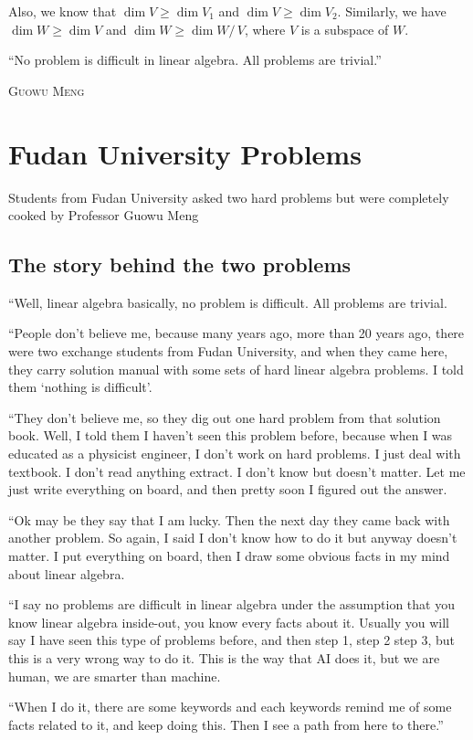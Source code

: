 \documentclass[
	11pt, %
	fleqn, %
	a4paper, %
]{LegrandOrangeBook}
\newcommand{\quotient}[2]{#1/\, #2} %
\let\originalepigraph\epigraph
\renewcommand\epigraph[2]{\originalepigraph{#1}{\textsc{#2}}}
\begin{document}
Also, we know that $\dim{V} \geq \dim{V_1}$ and $\dim{V} \geq \dim{V_2}$. Similarly, we have $\dim{W} \geq \dim{V}$ and $\dim{W} \geq \dim{\quotient{W}{V}}$, where $V$ is a subspace of $W$.

\newpage

\epigraph{``No problem is difficult in linear algebra. All problems are trivial.''}{Guowu Meng}

\section{Fudan University Problems}

Students from Fudan University asked two hard problems but were completely cooked by Professor Guowu Meng

\subsection{The story behind the two problems}
``Well, linear algebra basically, no problem is difficult. All problems are trivial. 

``People don't believe me, because many years ago, more than 20 years ago, there were two exchange students from Fudan University, and when they came here, they carry solution manual with some sets of hard linear algebra problems. I told them `nothing is difficult'. 

``They don't believe me, so they dig out one hard problem from that solution book. Well, I told them I haven't seen this problem before, because when I was educated as a physicist engineer, I don't work on hard problems. I just deal with textbook. I don't read anything extract. I don't know but doesn't matter. Let me just write everything on board, and then pretty soon I figured out the answer. 

``Ok may be they say that I am lucky. Then the next day they came back with another problem. So again, I said I don't know how to do it but anyway doesn't matter. I put everything on board, then I draw some obvious facts in my mind about linear algebra. 

``I say no problems are difficult in linear algebra under the assumption that you know linear algebra inside-out, you know every facts about it. Usually you will say I have seen this type of problems before, and then step 1, step 2 step 3, but this is a very wrong way to do it. This is the way that AI does it, but we are human, we are smarter than machine. 

``When I do it, there are some keywords and each keywords remind me of some facts related to it, and keep doing this. Then I see a path from here to there.'' 
\end{document}
